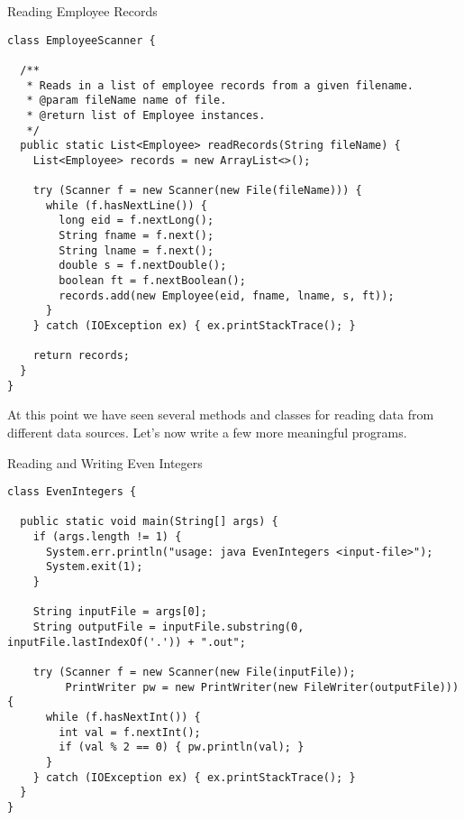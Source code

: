 \begin{cl}[]{Reading Employee Records}
\begin{lstlisting}[language=MyJava]
class EmployeeScanner {

  /**
   * Reads in a list of employee records from a given filename.
   * @param fileName name of file.
   * @return list of Employee instances.
   */
  public static List<Employee> readRecords(String fileName) {
    List<Employee> records = new ArrayList<>();

    try (Scanner f = new Scanner(new File(fileName))) {
      while (f.hasNextLine()) {
        long eid = f.nextLong();
        String fname = f.next();
        String lname = f.next();
        double s = f.nextDouble();
        boolean ft = f.nextBoolean();
        records.add(new Employee(eid, fname, lname, s, ft));
      }
    } catch (IOException ex) { ex.printStackTrace(); }

    return records;
  }
}
\end{lstlisting}
\end{cl}

At this point we have seen several methods and classes for reading data from different data sources. Let's now write a few more meaningful programs.


\begin{cl}[]{Reading and Writing Even Integers}
\begin{lstlisting}[language=MyJava]
class EvenIntegers {

  public static void main(String[] args) {
    if (args.length != 1) {
      System.err.println("usage: java EvenIntegers <input-file>");
      System.exit(1);
    }

    String inputFile = args[0];
    String outputFile = inputFile.substring(0, inputFile.lastIndexOf('.')) + ".out";

    try (Scanner f = new Scanner(new File(inputFile));
         PrintWriter pw = new PrintWriter(new FileWriter(outputFile))) {
      while (f.hasNextInt()) {
        int val = f.nextInt();
        if (val % 2 == 0) { pw.println(val); }
      }
    } catch (IOException ex) { ex.printStackTrace(); }
  }
}
\end{lstlisting}
\end{cl}

